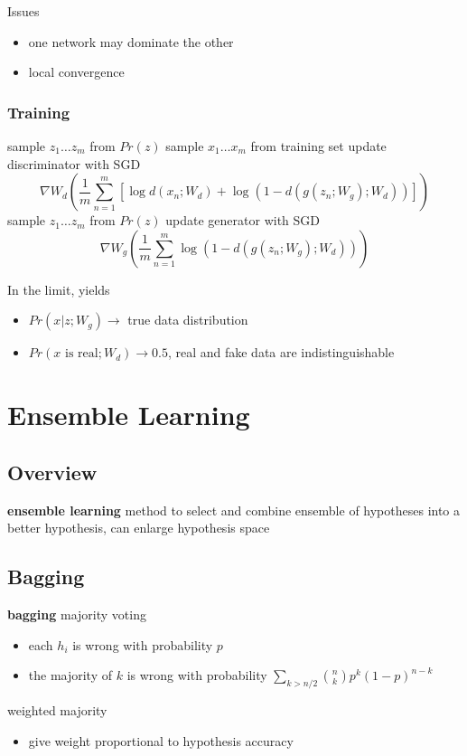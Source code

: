 \documentclass[]{article}
\theoremstyle{definition}
\begin{document}
Issues
\begin{itemize}
    \item one network may dominate the other
    \item local convergence
\end{itemize}

\subsubsection{Training}
\label{ssub:gan_training}

\begin{algorithmic}
    \State sample $z_1 \ldots z_m$ from $Pr(z)$
    \State sample $x_1 \ldots x_m$ from training set
    \State update discriminator with SGD
    \begin{equation*}
        \nabla W_d (\frac{1}{m} \sum_{n=1}^m [\log d(x_n; W_d) + \log(1- d(g(z_n;W_g); W_d))])
    \end{equation*}
    \EndFor
    \State sample $z_1 \ldots z_m$ from $Pr(z)$
    \State update generator with SGD
    \begin{equation*}
        \nabla W_g (\frac{1}{m} \sum_{n=1}^m \log(1- d(g(z_n;W_g); W_d)))
    \end{equation*}
\end{algorithmic}

In the limit, yields
\begin{itemize}
    \item $Pr(x|z;W_g) \to $ true data distribution
    \item $Pr(x \text{ is real}; W_d) \to 0.5$, real and fake data are indistinguishable
\end{itemize}

\section{Ensemble Learning}
\label{sec:ensemble_learning}

\subsection{Overview}
\label{sub:ensemble_overview}
\textbf{ensemble learning} method to select and combine ensemble of hypotheses into a better hypothesis, can enlarge hypothesis space


\subsection{Bagging}
\label{sub:bagging}
\textbf{bagging} majority voting
\begin{itemize}
    \item each $h_i$ is wrong with probability $p$
    \item the majority of $k$ is wrong with probability $\sum_{k > n/2} \binom{n}{k} p^k (1-p)^{n-k}$
\end{itemize}
weighted majority
\begin{itemize}
    \item give weight proportional to hypothesis accuracy
\end{itemize}
\end{document}
